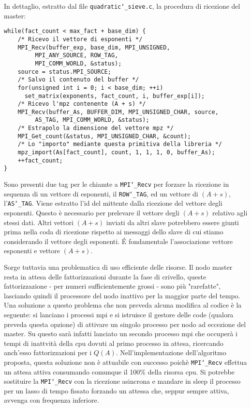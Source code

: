 In dettaglio, estratto dal file \texttt{quadratic\char`_sieve.c}, la procedura
di ricezione del master:
\begin{lstlisting}
while(fact_count < max_fact + base_dim) {
    /* Ricevo il vettore di esponenti */
    MPI_Recv(buffer_exp, base_dim, MPI_UNSIGNED,
	     MPI_ANY_SOURCE, ROW_TAG, 
	     MPI_COMM_WORLD, &status);
    source = status.MPI_SOURCE;
    /* Salvo il contenuto del buffer */
    for(unsigned int i = 0; i < base_dim; ++i) 
      set_matrix(exponents, fact_count, i, buffer_exp[i]);
    /* Ricevo l'mpz contenente (A + s) */
    MPI_Recv(buffer_As, BUFFER_DIM, MPI_UNSIGNED_CHAR, source, 
	     AS_TAG, MPI_COMM_WORLD, &status);
    /* Estrapolo la dimensione del vettore mpz */
    MPI_Get_count(&status, MPI_UNSIGNED_CHAR, &count);
    /* Lo "importo" mediante questa primitiva della libreria */
    mpz_import(As[fact_count], count, 1, 1, 1, 0, buffer_As);
    ++fact_count;
}
\end{lstlisting}
Sono presenti due tag per le chiamte a \texttt{MPI\char`_Recv} per forzare la
ricezione in sequenza di un vettore di esponenti, il \texttt{ROW\char`_TAG}, ed un
vettore di $(A + s)$, l'\texttt{AS\char`_TAG}. Viene estratto l'id del mittente dalla
ricezione del vettore degli esponenti. Questo è necessario per
prelevare il vettore degli $(A + s)$ relativo agli stessi dati. Altri
vettori $(A + s)$ inviati da altri slave potrebbero essere giunti
prima nella coda di ricezione rispetto ai messaggi dello slave
di cui stiamo considerando il vettore degli esponenti. \'E
fondamentale l'associazione vettore 
esponenti e vettore $(A + s)$.

Sorge tuttavia una problematica di uso efficiente delle risorse. Il
nodo master resta in attesa delle fattorizzazioni durante la fase di
crivello, queste fattorizzazione - per numeri sufficientemente grossi
- sono più "rarefatte", lasciando quindi il processore del nodo
inattivo per la maggior parte del tempo. Una soluzione a questo
problema che non preveda alcuna modifica al codice è la seguente:
si lanciano i processi mpi e si istruisce il gestore delle code
(qualora preveda questa opzione)  di attivare un singolo processo 
per nodo ad eccezione del master. Su questo sarà infatti lanciato un
secondo processo mpi che occuperà i tempi di inattvità della cpu
dovuti al primo processo in attesa, ricercando anch'esso
fattorizzazioni per i $Q(A)$. Nell'implementazione dell'algoritmo
proposta, questa soluzione non è
attuabile con  successo poichè \texttt{MPI\char`_Recv} effettua un attesa attiva
consumando comunque il 100\% della risorsa cpu. Si potrebbe sostituire
la \texttt{MPI\char`_Recv} con la ricezione asincrona e mandare in sleep il processo
per un lasso di tempo fissato forzando un attessa che, seppur sempre
attiva, avvenga con frequenza inferiore.
